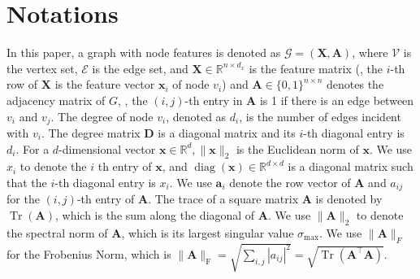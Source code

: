 \section{Notations}
\label{sec:not}
In this paper, a graph with node features is denoted as $\mathcal{G}=(\mathbf{X}, \mathbf{A})$, where $\mathcal{V}$ is the vertex set, $\mathcal{E}$ is the edge set, and $\mathbf{X} \in \mathbb{R}^{n \times d_{x}}$ is the feature matrix (\ie, the $i$-th row of $\mathbf{X}$ is the feature vector $\mathbf{x}_i$ of node $v_{i}$) and $\mathbf{A} \in\{0,1\}^{n \times n}$ denotes the adjacency matrix of $G$, \ie, the $(i, j)$-th entry in $\mathbf{A}$ is 1 if there is an edge between $v_{i}$ and $v_{j}$.
%
The degree of node $v_{i}$, denoted as $d_{i}$, is the number of edges incident with $v_{i}$.
%
The degree matrix $\mathbf{D}$ is a diagonal matrix and its $i$-th diagonal entry is $d_{i}$. 
%
For a $d$-dimensional vector $\mathbf{x} \in \mathbb{R}^{d}, \|\mathbf{x}\|_{2}$ is the Euclidean norm of $\mathbf{x}$.
%
We use ${x}_{i}$ to denote the $i$ th entry of $\mathbf{x}$, and $\operatorname{diag}(\mathbf{x}) \in \mathbb{R}^{d \times d}$ is a diagonal matrix such that the $i$-th diagonal entry is $x_{i}$. 
%
We use $\mathbf{a}_{i}$ denote the row vector of $\mathbf{A}$ and ${a}_{ij}$ for the $(i, j)$-th entry of $\mathbf{A}$. 
%
The trace of a square matrix $\mathbf{A}$ is denoted by $\operatorname{Tr}(\mathbf{A})$, which is the sum along the diagonal of $\mathbf{A}$. 
%
%
We use $\| \mathbf{A} \|_2$ to denote the spectral norm of $\mathbf{A}$, which is its largest singular value $\sigma_{\max}$. 
%
We use $\|\mathbf{A}\|_F$ for the Frobenius Norm, which is $\|\mathbf{A}\|_{\mathrm{F}}=\sqrt{\sum_{i,j}\left|a_{i j}\right|^{2}}=\sqrt{\operatorname{
Tr}\left(\mathbf{A^\top A}\right)}$.



